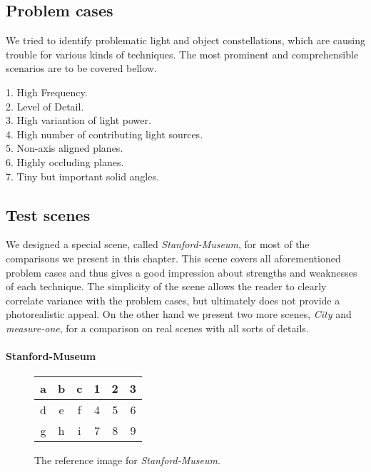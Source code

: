 \subsection{Problem cases}

We tried to identify problematic light and object constellations, which are causing trouble for various kinds of techniques. The most prominent and comprehensible scenarios are to be covered bellow. 

\begin{description}
    \item[1. High Frequency.] 
    \item[2. Level of Detail.]
    \item[3. High variantion of light power.] 
    \item[4. High number of contributing light sources.]
    \item[5. Non-axis aligned planes.]
    \item[6. Highly occluding planes.]
    \item[7. Tiny but important solid angles.] 
\end{description} 

\subsection{Test scenes}

We designed a special scene, called \textit{Stanford-Museum}, for most of the comparisons we present in this chapter. This scene covers all aforementioned problem cases and thus gives a good impression about strengths and weaknesses of each technique. The simplicity of the scene allows the reader to clearly correlate variance with the problem cases, but ultimately does not provide a photorealistic appeal. On the other hand we present two more scenes, \textit{City} and \textit{measure-one}, for a comparison on real scenes with all sorts of details.

\paragraph{Stanford-Museum}

\begin{figure}[ht]\centering

\caption{The reference image for \textit{Stanford-Museum}. }
\label{fig:stanfordmuseumref}
\begin{tabular}{|c|cc|ccc|}
\hline 
a  & b & c & 1 & 2 & 3 \\\hline
d  & e & f & 4 & 5 & 6 \\
g  & h & i & 7 & 8 & 9 \\\hline
\end{tabular}
\end{figure}

